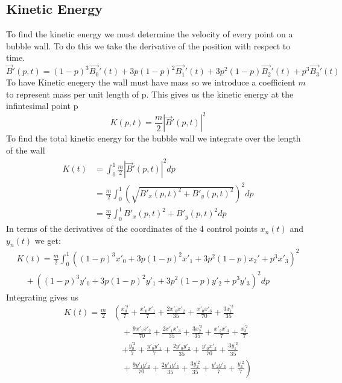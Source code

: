 \documentclass{article}
\begin{document}
\subsection{Kinetic Energy}
To find the kinetic energy we must determine the velocity of every point on a
bubble wall. To do this we take the derivative of the position with respect to
time.
\begin{displaymath}
\vec{B}'(p,t)=(1-p)^3\vec{B_0}'(t)+3p(1-p)^2\vec{B_1}'(t)+3p^2(1-p)\vec{B_2}'(t)+p^3\vec{B_3}'(t)
\end{displaymath}
To have Kinetic enegery the wall must have mass so we introduce a coefficient
$m$ to represent mass per unit length of p. This gives us the kinetic energy at the
infintesimal point p
\begin{displaymath}
K(p,t) = \frac{m}{2} \left|\vec{B}'(p,t)\right|^2
\end{displaymath}
To find the total kinetic energy for the bubble wall we integrate over the
length of the wall
\begin{align*}
K(t)&= \int_0^1 \frac{m}{2} \left|\vec{B}'(p,t)\right|^2 dp\\
&=\frac{m}{2} \int_0^1 \left(\sqrt{B'_x(p,t)^2+B'_y(p,t)^2}\right)^2 dp\\
&=\frac{m}{2} \int_0^1 B'_x(p,t)^2+B'_y(p,t)^2 dp
\end{align*}
In terms of the derivatives of the coordinates of the 4 control points $x_n(t)$
and $y_n(t)$ we get:
\begin{align*}
K(t)=\frac{m}{2} \int_0^1
\left((1-p)^3x'_0+3p(1-p)^2x'_1+3p^2(1-p)x_2'+p^3x'_3\right)^2 \\
 \quad+ \left((1-p)^3y'_0+3p(1-p)^2y'_1+3p^2(1-p)y'_2+p^3y'_3
\right)^2 dp
\end{align*}
Integrating gives us
\begin{align*}
K(t)=\frac{m}{2} &\left( 
\frac{x_0^{'2}}{7} + \frac{x'_0 x'_1}{7} + \frac{2 x'_0 x'_2}{35} + 
\frac{x'_0 x'_3}{70}  + \frac{3 x_1^{'2}}{35} \right.\\
&\left.\quad +\frac{9 x'_1 x'_2}{70} 
+ \frac{2 x'_1 x'_3}{35} + \frac{3 x_2^{'2}}{35} + \frac{x'_2 x'_3}{7} +\frac{x_3^{'2}}{7}\right.\\
&\quad\left. +\frac{y_0^{'2}}{7} + \frac{y'_0 y'_1}{7} + \frac{2 y'_0 y'_2}{35} + 
\frac{y'_0 x'_3}{70} + \frac{3 y_1^{'2}}{35} \right.\\
&\left.\quad  +\frac{9 y'_1 y'_2}{70} 
+ \frac{2 y'_1 y'_3}{35} + \frac{3 y_2^{'2}}{35} + \frac{y'_2 y'_3}{7}
+\frac{y_3^{'2}}{7}\right)
\end{align*}
\end{document}
